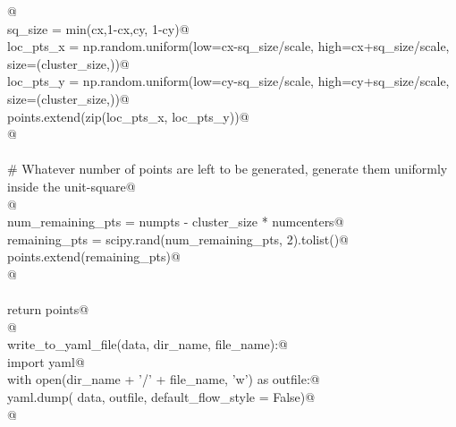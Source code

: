 \documentclass[10.0pt]{report}
\begin{document}
\begin{appendices}
\begin{flushleft}
\begin{list}{}{}
\mbox{}\verb@           @\\
\mbox{}\verb@        sq_size      = min(cx,1-cx,cy, 1-cy)@\\
\mbox{}\verb@        loc_pts_x    = np.random.uniform(low=cx-sq_size/scale, high=cx+sq_size/scale, size=(cluster_size,))@\\
\mbox{}\verb@        loc_pts_y    = np.random.uniform(low=cy-sq_size/scale, high=cy+sq_size/scale, size=(cluster_size,))@\\
\mbox{}\verb@        points.extend(zip(loc_pts_x, loc_pts_y))@\\
\mbox{}\verb@        @\\
\mbox{}\verb@@\\
\mbox{}\verb@    # Whatever number of points are left to be generated, generate them uniformly inside the unit-square@\\
\mbox{}\verb@       @\\
\mbox{}\verb@    num_remaining_pts = numpts - cluster_size * numcenters@\\
\mbox{}\verb@    remaining_pts = scipy.rand(num_remaining_pts, 2).tolist()@\\
\mbox{}\verb@    points.extend(remaining_pts)@\\
\mbox{}\verb@    @\\
\mbox{}\verb@@\\
\mbox{}\verb@    return points@\\
\mbox{}\verb@    @\\
\mbox{}\verb@def write_to_yaml_file(data, dir_name, file_name):@\\
\mbox{}\verb@   import yaml@\\
\mbox{}\verb@   with open(dir_name + '/' + file_name, 'w') as outfile:@\\
\mbox{}\verb@     yaml.dump( data, outfile, default_flow_style = False)@\\
\mbox{}\verb@ @\\
\mbox{}\verb@@\\
\mbox{}\verb@@{\NWsep}
\end{list}
\vspace{-1.5ex}
\footnotesize
\begin{list}{}{\setlength{\itemsep}{-\parsep}\setlength{\itemindent}{-\leftmargin}}

\item{}
\end{list}
\vspace{4ex}
\end{flushleft}




\end{appendices}
\end{document}

